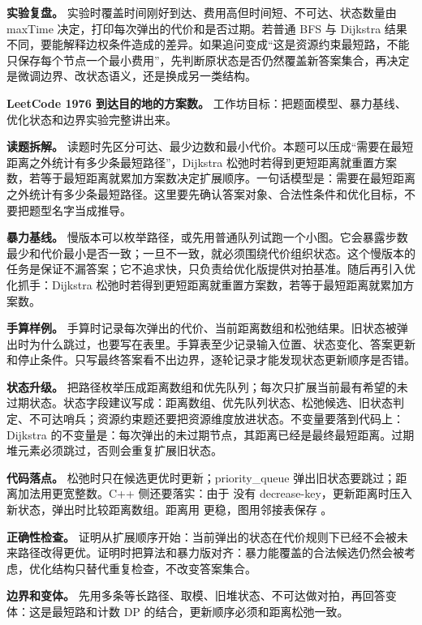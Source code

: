 \textbf{实验复盘。} 实验时覆盖时间刚好到达、费用高但时间短、不可达、状态数量由 maxTime 决定，打印每次弹出的代价和是否过期。若普通 BFS 与 Dijkstra 结果不同，要能解释边权条件造成的差异。如果追问变成“这是资源约束最短路，不能只保存每个节点一个最小费用”，先判断原状态是否仍然覆盖新答案集合，再决定是微调边界、改状态语义，还是换成另一类结构。

\noindent\textbf{LeetCode 1976 到达目的地的方案数。} 工作坊目标：把题面模型、暴力基线、优化状态和边界实验完整讲出来。

\textbf{读题拆解。} 读题时先区分可达、最少边数和最小代价。本题可以压成“需要在最短距离之外统计有多少条最短路径”，Dijkstra 松弛时若得到更短距离就重置方案数，若等于最短距离就累加方案数决定扩展顺序。一句话模型是：需要在最短距离之外统计有多少条最短路径。这里要先确认答案对象、合法性条件和优化目标，不要把题型名字当成推导。

\textbf{暴力基线。} 慢版本可以枚举路径，或先用普通队列试跑一个小图。它会暴露步数最少和代价最小是否一致；一旦不一致，就必须围绕代价组织状态。这个慢版本的任务是保证不漏答案；它不追求快，只负责给优化版提供对拍基准。随后再引入优化抓手：Dijkstra 松弛时若得到更短距离就重置方案数，若等于最短距离就累加方案数。

\textbf{手算样例。} 手算时记录每次弹出的代价、当前距离数组和松弛结果。旧状态被弹出时为什么跳过，也要写在表里。手算表至少记录输入位置、状态变化、答案更新和停止条件。只写最终答案看不出边界，逐轮记录才能发现状态更新顺序是否错。

\textbf{状态升级。} 把路径枚举压成距离数组和优先队列；每次只扩展当前最有希望的未过期状态。状态字段建议写成：距离数组、优先队列状态、松弛候选、旧状态判定、不可达哨兵；资源约束题还要把资源维度放进状态。不变量要落到代码上：Dijkstra 的不变量是：每次弹出的未过期节点，其距离已经是最终最短距离。过期堆元素必须跳过，否则会重复扩展旧状态。

\textbf{代码落点。} 松弛时只在候选更优时更新；priority\_queue 弹出旧状态要跳过；距离加法用更宽整数。C++ 侧还要落实：由于  没有 decrease-key，更新距离时压入新状态，弹出时比较距离数组。距离用  更稳，图用邻接表保存 。

\textbf{正确性检查。} 证明从扩展顺序开始：当前弹出的状态在代价规则下已经不会被未来路径改得更优。证明时把算法和暴力版对齐：暴力能覆盖的合法候选仍然会被考虑，优化结构只替代重复检查，不改变答案集合。

\textbf{边界和变体。} 先用多条等长路径、取模、旧堆状态、不可达做对拍，再回答变体：这是最短路和计数 DP 的结合，更新顺序必须和距离松弛一致。

